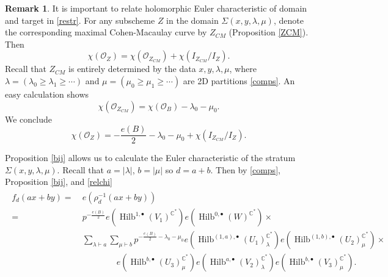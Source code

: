 \documentclass{amsart}
\theoremstyle{definition}
\newtheorem{remark}[theorem]{Remark}
\newcommand{\CC} {\mathbb{C}}          %
\renewcommand{\O}{\mathcal{O}}
\newcommand{\Hilb}{\operatorname{Hilb}}
\begin{document}
\begin{remark}
It is important to relate holomorphic Euler characteristic of domain and target in \eqref{restr}. For any subscheme $Z$ in the domain $\Sigma(x,y,\lambda,\mu)$, denote the corresponding maximal Cohen-Macaulay curve by $Z_{CM}$ (Proposition \ref{ZCM}). Then
$$
\chi(\O_Z) = \chi(\O_{Z_{CM}}) + \chi(I_{Z_{CM}} / I_{Z}).
$$ 
Recall that $Z_{CM}$ is entirely determined by the data $x,y, \lambda, \mu$, where $\lambda = (\lambda_0 \geq \lambda_1 \geq \cdots)$ and $\mu = (\mu_0 \geq \mu_1 \geq \cdots)$ are 2D partitions \eqref{comps}. An easy calculation shows 
$$
\chi(\O_{Z_{CM}}) = \chi(\O_B) - \lambda_0 - \mu_0.
$$
We conclude
\begin{equation} \label{relchi}
\chi(\O_Z) = -\frac{e(B)}{2} - \lambda_0 - \mu_0 + \chi(I_{Z_{CM}} / I_{Z}).
\end{equation}
\end{remark}

Proposition \ref{bij} allows us to calculate the Euler characteristic of the stratum $\Sigma(x,y,\lambda,\mu)$. Recall that $a = |\lambda|$, $b=|\mu|$ so $d=a+b$. Then by \eqref{comps}, Proposition \ref{bij}, and \eqref{relchi}
\begin{align}
\begin{split} \label{fdintermediate}
f_d(ax+by) = \ &e(\rho_{d}^{-1}(ax+by)) \\
= \ &p^{-\frac{e(B)}{2}} e(\Hilb^{1,\bullet}(V_1)^{\CC^*}) e(\Hilb^{0,\bullet}(W)^{\CC^*}) \times \\
&\sum_{\lambda \vdash a} \sum_{\mu \vdash b} p^{-\frac{e(B)}{2} - \lambda_0 - \mu_0 } e(\Hilb^{(1,a),\bullet}(U_1)_{\lambda}^{\CC^*}) e(\Hilb^{(1,b),\bullet}(U_2)_{\mu}^{\CC^*}) \times \\
&\qquad\qquad e(\Hilb^{b,\bullet}(U_3)_{\mu}^{\CC^*}) e(\Hilb^{a,\bullet}(V_2)_{\lambda}^{\CC^*}) e(\Hilb^{b,\bullet}(V_3)_{\mu}^{\CC^*}).
\end{split}
\end{align}
\end{document}
